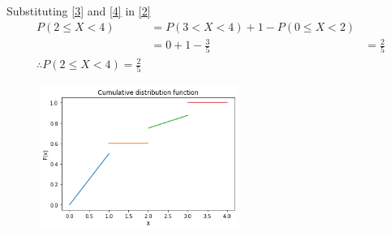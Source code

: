 \documentclass[journal,12pt,twocolumn]{IEEEtran}
\begin{document}
Substituting \eqref{3} and \eqref{4} in \eqref{2}
\begin{align}
P(2 \leq X <4) &=  P(3<X<4) + 1  - P(0 \leq X <2)\\
&= 0+1- \frac{3}{5}
&=\frac{2}{5}\\
\therefore P(2 \leq X <4) = \frac{2}{5}
\end{align}




\begin{figure}[htb!]
\includegraphics[width=0.58\textwidth]{assignment2.png}
\end{figure}
\end{document}
